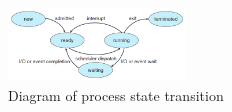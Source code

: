 \begin{figure}[!htb]
    \centering
    \includegraphics[width=0.42\textwidth]{pic/OS3/Diagram of process state.png}
    \caption{Diagram of process state transition}
\end{figure}


